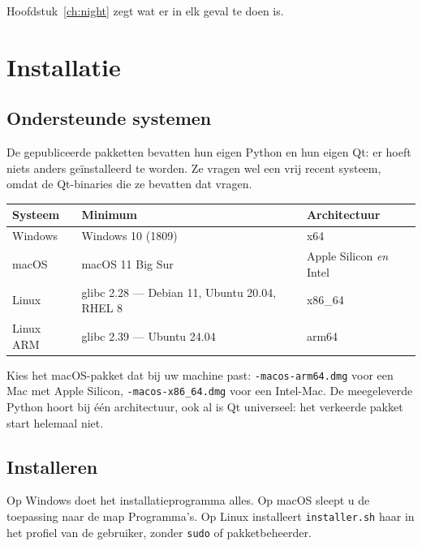 Hoofdstuk~\ref{ch:night} zegt wat er in elk geval te doen is.

\chapter{Installatie}
\label{ch:install}

\section{Ondersteunde systemen}

De gepubliceerde pakketten bevatten hun eigen Python en hun eigen Qt: er hoeft
niets anders geïnstalleerd te worden. Ze vragen wel een vrij recent systeem,
omdat de Qt-binaries die ze bevatten dat vragen.

\begin{center}
\begin{tabularx}{\textwidth}{lXl}
\toprule
\textbf{Systeem} & \textbf{Minimum} & \textbf{Architectuur} \\
\midrule
Windows & Windows 10 (1809) & x64 \\
macOS & macOS 11 Big Sur & Apple Silicon \emph{en} Intel \\
Linux & glibc 2.28 --- Debian 11, Ubuntu 20.04, RHEL 8 & x86\_64 \\
Linux ARM & glibc 2.39 --- Ubuntu 24.04 & arm64 \\
\bottomrule
\end{tabularx}
\end{center}

\begin{warning}
Kies het macOS-pakket dat bij uw machine past: \texttt{-macos-arm64.dmg} voor
een Mac met Apple Silicon, \texttt{-macos-x86\_64.dmg} voor een Intel-Mac. De
meegeleverde Python hoort bij één architectuur, ook al is Qt universeel: het
verkeerde pakket start helemaal niet.
\end{warning}

\section{Installeren}

Op Windows doet het installatieprogramma alles. Op macOS sleept u de toepassing
naar de map Programma's. Op Linux installeert \texttt{installer.sh} haar in het
profiel van de gebruiker, zonder \texttt{sudo} of pakketbeheerder.

